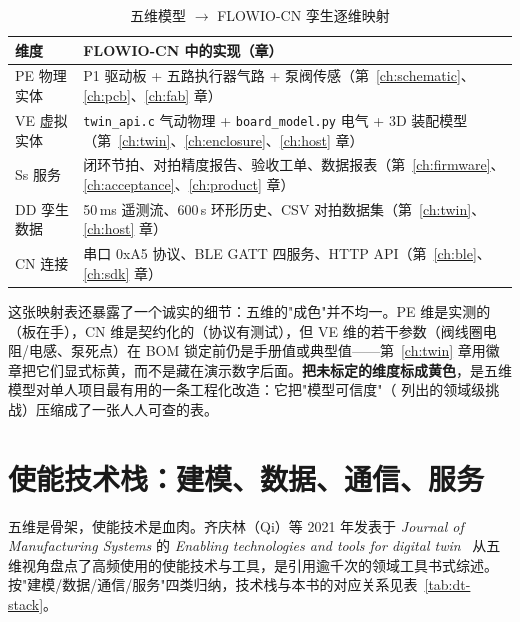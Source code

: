\begin{table}[htbp]
  \centering
  \caption{五维模型 $\to$ FLOWIO-CN 孪生逐维映射}
  \label{tab:dt-5d-map}
  \begin{tabular}{lp{6.6cm}}
    \toprule
    维度 & FLOWIO-CN 中的实现（章） \\
    \midrule
    PE 物理实体 & P1 驱动板 + 五路执行器气路 + 泵阀传感（第~\ref{ch:schematic}、\ref{ch:pcb}、\ref{ch:fab} 章） \\
    VE 虚拟实体 & \texttt{twin\_api.c} 气动物理 + \texttt{board\_model.py} 电气 + 3D 装配模型（第~\ref{ch:twin}、\ref{ch:enclosure}、\ref{ch:host} 章） \\
    Ss 服务 & 闭环节拍、对拍精度报告、验收工单、数据报表（第~\ref{ch:firmware}、\ref{ch:acceptance}、\ref{ch:product} 章） \\
    DD 孪生数据 & 50\,ms 遥测流、600\,s 环形历史、CSV 对拍数据集（第~\ref{ch:twin}、\ref{ch:host} 章） \\
    CN 连接 & 串口 0xA5 协议、BLE GATT 四服务、HTTP API（第~\ref{ch:ble}、\ref{ch:sdk} 章） \\
    \bottomrule
  \end{tabular}
\end{table}

这张映射表还暴露了一个诚实的细节：五维的"成色"并不均一。PE 维是实测的（板在手），CN 维是契约化的（协议有测试），但 VE 维的若干参数（阀线圈电阻/电感、泵死点）在 BOM 锁定前仍是手册值或典型值——第~\ref{ch:twin} 章用徽章把它们显式标黄，而不是藏在演示数字后面。\textbf{把未标定的维度标成黄色}，是五维模型对单人项目最有用的一条工程化改造：它把"模型可信度"（\cite{Tao2019} 列出的领域级挑战）压缩成了一张人人可查的表。

\section{使能技术栈：建模、数据、通信、服务}
\label{sec:dt-stack}

五维是骨架，使能技术是血肉。齐庆林（Qi）等 2021 年发表于 \emph{Journal of Manufacturing Systems} 的 \emph{Enabling technologies and tools for digital twin}~\cite{Qi2021} 从五维视角盘点了高频使用的使能技术与工具，是引用逾千次的领域工具书式综述。按"建模/数据/通信/服务"四类归纳，技术栈与本书的对应关系见表~\ref{tab:dt-stack}。

